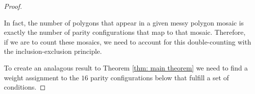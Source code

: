 \documentclass[12pt]{article}
\theoremstyle{plain}
\theoremstyle{definition}
\theoremstyle{remark}
\theoremstyle{definition}
\newcommand{\cellA}[4]{ \draw[thick] ( #1 , #2 ) rectangle ( #3 , #4 ); \draw[red, thick, densely dotted] (#3 * 0.5 + #1 * 0.5 , #2) -- (#3, #4 * 0.5 + #2 * 0.5);}
\newcommand{\cellB}[4]{ \draw[thick] ( #1 , #2 ) rectangle ( #3 , #4 ); \draw[red, thick, densely dotted] (#3 * 0.5 + #1 * 0.5 , #2) -- (#1, #4 * 0.5 + #2 * 0.5);}
\newcommand{\cellC}[4]{ \draw[thick] ( #1 , #2 ) rectangle ( #3 , #4 ); \draw[red, thick, densely dotted] (#3 * 0.5 + #1 * 0.5 , #4) -- (#1, #4 * 0.5 + #2 * 0.5);}
\newcommand{\cellD}[4]{ \draw[thick] ( #1 , #2 ) rectangle ( #3 , #4 ); \draw[red, thick, densely dotted] (#3 * 0.5 + #1 * 0.5 , #4) -- (#3, #4 * 0.5 + #2 * 0.5);}
\begin{document}
\begin{proof}
\begin{center}
\end{center}

In fact, the number of polygons that appear in a given messy polygon mosaic is exactly the number of parity configurations that map to that mosaic. Therefore, if we are to count these mosaics, we need to account for this double-counting with the inclusion-exclusion principle.  

To create an analagous result to Theorem \ref{thm: main theorem} we need to find a weight assignment to the $16$ parity configurations below that fulfill a set of conditions.


\end{proof}
\end{document}
